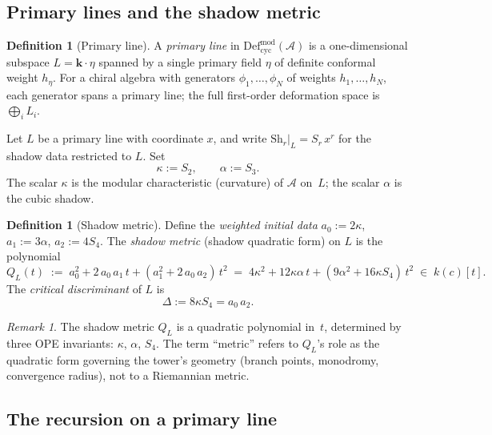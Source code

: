 \documentclass[11pt]{article}
\theoremstyle{plain}
\theoremstyle{definition}
\newtheorem{definition}[theorem]{Definition}
\theoremstyle{remark}
\newtheorem{remark}[theorem]{Remark}
\begin{document}
\subsection{Primary lines and the shadow metric}

\begin{definition}[Primary line]
\label{def:primary-line}
A \emph{primary line} in $\mathrm{Def}_{\mathrm{cyc}}^{\mathrm{mod}}(\mathcal{A})$
is a one-dimensional subspace $L = \mathbf{k} \cdot \eta$
spanned by a single primary field $\eta$ of definite conformal
weight $h_\eta$. For a chiral algebra with generators
$\phi_1, \ldots, \phi_N$ of weights $h_1, \ldots, h_N$,
each generator spans a primary line; the full first-order
deformation space is $\bigoplus_i L_i$.
\end{definition}

Let $L$ be a primary line with coordinate $x$, and write
$\mathrm{Sh}_r|_L = S_r \, x^r$ for the shadow data restricted
to $L$. Set
\[
 \kappa := S_2, \qquad \alpha := S_3.
\]
The scalar $\kappa$ is the modular characteristic (curvature)
of $\mathcal{A}$ on~$L$; the scalar $\alpha$ is the cubic shadow.

\begin{definition}[Shadow metric]
\label{def:shadow-metric-paper}
Define the \emph{weighted initial data}
$a_0 := 2\kappa$, $a_1 := 3\alpha$, $a_2 := 4S_4$.
The \emph{shadow metric} (shadow quadratic form) on $L$ is the
polynomial
\begin{equation}
\label{eq:shadow-metric}
 Q_L(t)
 \;:=\;
 a_0^2 + 2\,a_0\,a_1\,t + (a_1^2 + 2\,a_0\,a_2)\,t^2
 \;=\;
 4\kappa^2 + 12\kappa\alpha\,t + (9\alpha^2 + 16\kappa S_4)\,t^2
 \;\in\; k(c)[t].
\end{equation}
The \emph{critical discriminant} of $L$ is
\begin{equation}
\label{eq:critical-discriminant}
 \Delta := 8\kappa S_4 = a_0 \, a_2.
\end{equation}
\end{definition}

\begin{remark}
The shadow metric $Q_L$ is a quadratic polynomial in~$t$,
determined by three OPE invariants: $\kappa$, $\alpha$, $S_4$.
The term ``metric'' refers to $Q_L$'s role as the quadratic form
governing the tower's geometry (branch points, monodromy,
convergence radius), not to a Riemannian metric.
\end{remark}

\subsection{The recursion on a primary line}
\end{document}
